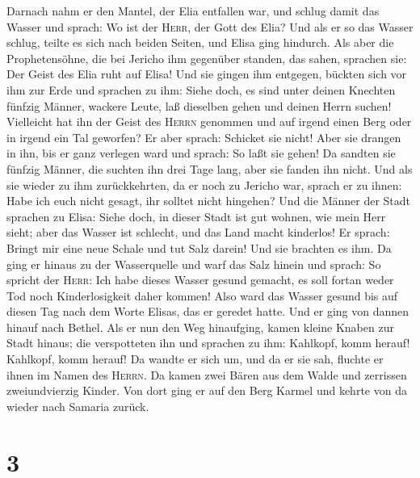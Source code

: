 Darnach nahm er den Mantel, der Elia entfallen war, und schlug damit das
Wasser und sprach: Wo ist der \textsc{Herr}, der Gott des Elia? Und als
er so das Wasser schlug, teilte es sich nach beiden Seiten, und Elisa
ging hindurch.  Als aber die Prophetensöhne, die bei
Jericho ihm gegenüber standen, das sahen, sprachen sie: Der Geist des
Elia ruht auf Elisa! Und sie gingen ihm entgegen, 
bückten sich vor ihm zur Erde und sprachen zu ihm: Siehe doch, es sind
unter deinen Knechten fünfzig Männer, wackere Leute, laß dieselben gehen
und deinen Herrn suchen! Vielleicht hat ihn der Geist des \textsc{Herrn}
genommen und auf irgend einen Berg oder in irgend ein Tal geworfen? Er
aber sprach: Schicket sie nicht!  Aber sie drangen in
ihn, bis er ganz verlegen ward und sprach: So laßt sie gehen! Da sandten
sie fünfzig Männer, die suchten ihn drei Tage lang, aber sie fanden ihn
nicht.  Und als sie wieder zu ihm zurückkehrten, da er
noch zu Jericho war, sprach er zu ihnen: Habe ich euch nicht gesagt, ihr
solltet nicht hingehen?  Und die Männer der Stadt
sprachen zu Elisa: Siehe doch, in dieser Stadt ist gut wohnen, wie mein
Herr sieht; aber das Wasser ist schlecht, und das Land macht kinderlos!
 Er sprach: Bringt mir eine neue Schale und tut Salz
darein! Und sie brachten es ihm.  Da ging er hinaus zu
der Wasserquelle und warf das Salz hinein und sprach: So spricht der
\textsc{Herr}: Ich habe dieses Wasser gesund gemacht, es soll fortan
weder Tod noch Kinderlosigkeit daher kommen!  Also ward
das Wasser gesund bis auf diesen Tag nach dem Worte Elisas, das er
geredet hatte.  Und er ging von dannen hinauf nach
Bethel. Als er nun den Weg hinaufging, kamen kleine Knaben zur Stadt
hinaus; die verspotteten ihn und sprachen zu ihm: Kahlkopf, komm herauf!
Kahlkopf, komm herauf!  Da wandte er sich um, und da er
sie sah, fluchte er ihnen im Namen des \textsc{Herrn}. Da kamen zwei
Bären aus dem Walde und zerrissen zweiundvierzig Kinder. 
Von dort ging er auf den Berg Karmel und kehrte von da wieder nach
Samaria zurück.

\hypertarget{section-2}{%
\section{3}\label{section-2}}

